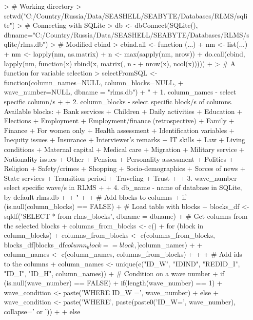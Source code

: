 \documentclass[12pt,a4paper]{article}
\begin{document}
\begin{Schunk}
\begin{Sinput}
> # Working directory
> setwd("C:/Country/Russia/Data/SEASHELL/SEABYTE/Databases/RLMS/sqlite")
> # Connecting with SQLite
> db <- dbConnect(SQLite(), dbname="C:/Country/Russia/Data/SEASHELL/SEABYTE/Databases/RLMS/sqlite/rlms.db")
> # Modified cbind
> cbind.all <- function (...){
+   nm <- list(...)
+   nm <- lapply(nm, as.matrix)
+   n <- max(sapply(nm, nrow))
+   do.call(cbind, lapply(nm, function(x) rbind(x, matrix(, n - 
+                                                           nrow(x), ncol(x)))))
+ }
> # A function for variable selection
> selectFromSQL <- function(column_names=NULL, column_blocks=NULL,
+                           wave_number=NULL, dbname = "rlms.db"){
+   "
+   1. column_names - select specific column/s
+   
+   2. column_blocks - select specific block/s of columns. Available blocks:
+   Bank services
+   Children
+   Daily activities
+   Education
+   Elections
+   Employment
+   Employment/finance (retrospective)
+   Family
+   Finance
+   For women only
+   Health assessment
+   Identification variables
+   Inequity issues
+   Insurance
+   Interviewer's remarks
+   IT skills
+   Law
+   Living conditions
+   Maternal capital
+   Medical care
+   Migration
+   Military service
+   Nationality issues
+   Other
+   Pension
+   Personality assessment
+   Politics
+   Religion
+   Safety/crimes
+   Shopping
+   Socio-demographics
+   Sorces of news
+   State services
+   Transition period
+   Traveling
+   Trust
+   
+   3. wave_number - select specific wave/s in RLMS
+   
+   4. db_name - name of database in SQLite, by default rlms.db
+   
+   "
+   
+   # Add blocks to columns
+   if (is.null(column_blocks) == FALSE){
+     # Load table with blocks
+     blocks_df <- sqldf('SELECT * from rlms_blocks', dbname = dbname)
+     # Get columns from the selected blocks
+     columns_from_blocks <- c()
+     for (block in column_blocks){
+       columns_from_blocks <- c(columns_from_blocks, blocks_df[blocks_df$column_block == block,]$column_names)
+     }
+     column_names <- c(column_names, columns_from_blocks)
+   }
+   
+   # Add ids to the columns
+   column_names <- unique(c("ID_W", "IDIND", "REDID_I", "ID_I", "ID_H", column_names))
+   # Condition on a wave number 
+   if (is.null(wave_number) == FALSE){
+     if(length(wave_number) == 1){
+       wave_condition <- paste('WHERE ID_W =', wave_number)
+     } else {
+       wave_condition <- paste('WHERE', paste(paste0('ID_W=', wave_number), collapse=' or '))
+     }
+   } else {
}}
\end{Sinput}
\end{Schunk}
\end{document}
